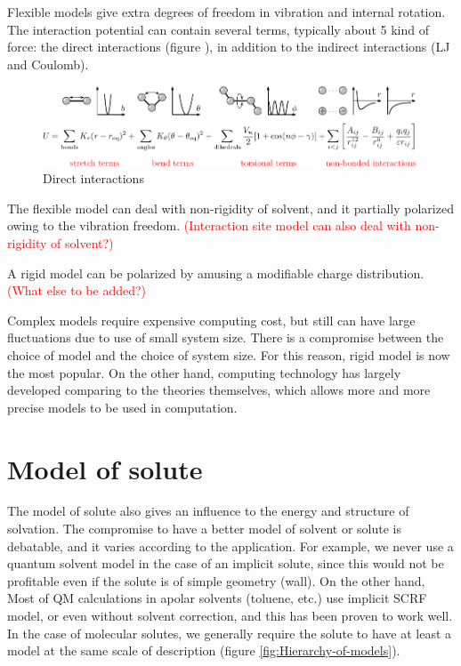 Flexible models give extra degrees of freedom in vibration and internal
rotation. The interaction potential can contain several terms, typically
about 5 kind of force: the direct interactions (figure ), in addition
to the indirect interactions (LJ and Coulomb).

\begin{figure}[h]
\begin{centering}
\includegraphics[width=1\columnwidth]{_figure/flexible}
\par\end{centering}

\caption{Direct interactions}
\end{figure}


The flexible model can deal with non-rigidity of solvent, and it partially
polarized owing to the vibration freedom. \textcolor{red}{(Interaction
site model can also deal with non-rigidity of solvent?)}

A rigid model can be polarized by amusing a modifiable charge distribution.
\textcolor{red}{(What else to be added?)}

Complex models require expensive computing cost, but still can have
large fluctuations due to use of small system size. There is a compromise
between the choice of model and the choice of system size. For this
reason, rigid model is now the most popular. On the other hand, computing
technology has largely developed comparing to the theories themselves,
which allows more and more precise models to be used in computation. 


\section{Model of solute}

The model of solute also gives an influence to the energy and structure
of solvation. The compromise to have a better model of solvent or
solute is debatable, and it varies according to the application. For
example, we never use a quantum solvent model in the case of an implicit
solute, since this would not be profitable even if the solute is of
simple geometry (wall). On the other hand, Most of \acs{QM} calculations
in apolar solvents (toluene, etc.) use implicit SCRF model, or even
without solvent correction, and this has been proven to work well.
In the case of molecular solutes, we generally require the solute
to have at least a model at the same scale of description (figure
\ref{fig:Hierarchy-of-models}).

